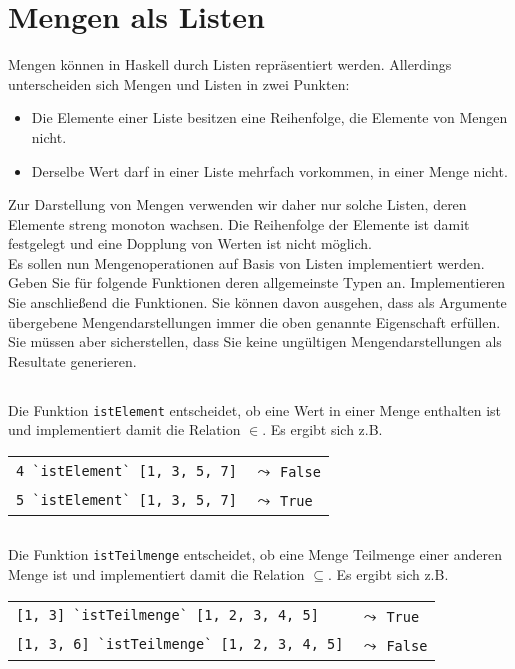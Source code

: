 \documentclass[
  10pt,                   %
  DIV12,
  german,                 %
  oneside,                %
  parskip=half,           %
  headings=normal,        %
  captions=tableheading,  %
]{scrartcl}
\begin{document}
\section{Mengen als Listen}
Mengen können in Haskell durch Listen repräsentiert werden. Allerdings unterscheiden
sich Mengen und Listen in zwei Punkten:
\begin{itemize}
  \item Die Elemente einer Liste besitzen eine Reihenfolge, die Elemente von Mengen
nicht.
\item Derselbe Wert darf in einer Liste mehrfach vorkommen, in einer Menge nicht.
\end{itemize}
Zur Darstellung von Mengen verwenden wir daher nur solche Listen, deren Elemente
streng monoton wachsen. Die Reihenfolge der Elemente ist damit festgelegt und eine
Dopplung von Werten ist nicht möglich.\\

Es sollen nun Mengenoperationen auf Basis von Listen implementiert werden. Geben Sie
für folgende Funktionen deren allgemeinste Typen an. Implementieren Sie anschließend
die Funktionen. Sie können davon ausgehen, dass als Argumente übergebene Mengendarstellungen
immer die oben genannte Eigenschaft erfüllen. Sie müssen aber sicherstellen, dass Sie keine ungültigen Mengendarstellungen als Resultate generieren.
\subsection{}
Die Funktion \lstinline|istElement| entscheidet, ob eine Wert in einer
Menge enthalten ist und implementiert damit die Relation $\in$. Es ergibt sich z.B.
\begin{center}
\begin{tabular}{ll}
\lstinline|4 `istElement` [1, 3, 5, 7]| & $\leadsto$ \lstinline|False|\\
\lstinline|5 `istElement` [1, 3, 5, 7]| & $\leadsto$ \lstinline|True|
\end{tabular}
\end{center}
\subsection{}
Die Funktion \lstinline|istTeilmenge| entscheidet, ob eine Menge Teilmenge einer anderen Menge ist und implementiert damit die Relation $\subseteq$. Es ergibt sich z.B.
\begin{center}
\begin{tabular}{ll}
\lstinline|[1, 3] `istTeilmenge` [1, 2, 3, 4, 5]| & $\leadsto$ \lstinline|True|\\
\lstinline|[1, 3, 6] `istTeilmenge` [1, 2, 3, 4, 5]| & $\leadsto$ \lstinline|False|
\end{tabular}
\end{center}
\end{document}
